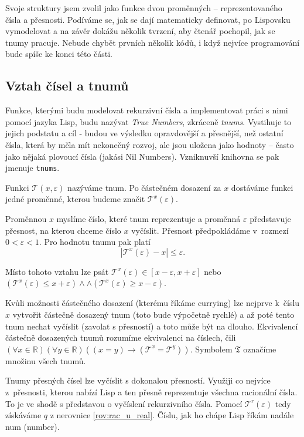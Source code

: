 Svoje struktury jsem zvolil jako funkce dvou proměnných -- reprezentovaného čísla a přesnosti. Podíváme se, jak se dají matematicky definovat, po Lispovsku vymodelovat a na závěr dokážu několik tvrzení, aby čtenář pochopil, jak se tnumy pracuje. Nebude chybět prvních několik kódů, i když nejvíce programování bude spíše ke konci této části.
\subsection{Vztah čísel a tnumů}
Funkce, kterými budu modelovat rekurzivní čísla a implementovat práci s nimi pomocí jazyka Lisp, budu nazývat \textit{True Numbers}, zkráceně \textit{tnums}. Vystihuje to jejich podstatu a cíl - budou ve výsledku opravdovější a přesnější, než ostatní čísla, která by měla mít nekonečný rozvoj, ale jsou uložena jako hodnoty – často jako nějaká plovoucí čísla (jakási Nil Numbers). Vzniknuvší knihovna se pak jmenuje \texttt{tnums}.

\begin{definition}[Tnum]\label{def:tnum}
Funkci $\mathcal{T}(x, \varepsilon )$ nazýváme tnum. Po částečném dosazení za $x$ dostáváme funkci jedné proměnné, kterou budeme značit $\mathcal{T}^x(\varepsilon)$. 

Proměnnou $x$ myslíme číslo, které tnum reprezentuje a proměnná $\varepsilon$ představuje přesnost, na kterou chceme číslo $x$ vyčíslit. Přesnost předpokládáme v~rozmezí $0<\varepsilon<1$. Pro hodnotu tnumu pak platí
\begin{equation}\label{rov:def:tnum}
|\mathcal{T}^x(\varepsilon) - x |\leq \varepsilon.
\end{equation}
\end{definition}

Místo tohoto vztahu lze psát $\mathcal{T}^x(\varepsilon)\in[x-\varepsilon,x+\varepsilon]$ nebo $(\mathcal{T}^x(\varepsilon)\leq x+\varepsilon)\land\land(\mathcal{T}^x(\varepsilon)\geq x-\varepsilon)$. 

Kvůli možnosti částečného dosazení (kterému říkáme currying) lze nejprve k~číslu $x$ vytvořit částečně dosazený tnum (toto bude výpočetně rychlé) a až poté tento tnum nechat vyčíslit (zavolat s přesností) a toto může být na dlouho. Ekvivalencí částečně dosazených tnumů rozumíme ekvivalenci na číslech, čili $(\forall x \in \mathbb{R})(\forall y\in\mathbb{R})((x=y)\to(\mathcal{T}^x=\mathcal{T}^y))$. Symbolem $\mathfrak{T}$ označíme množinu všech tnumů.

Tnumy přesných čísel lze vyčíslit s dokonalou přesností. Využiji co nejvíce z~přesnosti, kterou nabízí Lisp a ten přesně reprezentuje všechna racionální čísla. To je ve shodě s představou o vyčíslení rekurzivního čísla. Pomocí $\mathcal{T}^r(\varepsilon)$ tedy získáváme $q$ z nerovnice \ref{rov:rac_u_real}. Číslu, jak ho chápe Lisp říkám nadále num (number).

